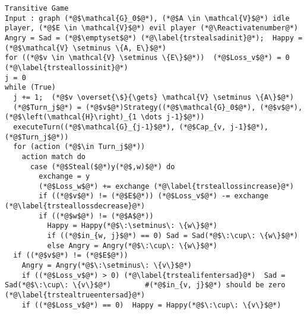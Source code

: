      \Suppressnumber
     \begin{lstlisting}[label=transitivegame, style=numbers]
Transitive Game
Input : graph (*@$\mathcal{G}_0$@*), (*@$A \in \mathcal{V}$@*) idle player, (*@$E \in \mathcal{V}$@*) evil player (*@\Reactivatenumber@*)
Angry = Sad = (*@$\emptyset$@*) (*@\label{trstealsadinit}@*);  Happy = (*@$\mathcal{V} \setminus \{A, E\}$@*)
for ((*@$v \in \mathcal{V} \setminus \{E\}$@*))  (*@$Loss_v$@*) = 0 (*@\label{trsteallossinit}@*)
j = 0
while (True)
  j += 1;  (*@$v \overset{\$}{\gets} \mathcal{V} \setminus \{A\}$@*)
  (*@$Turn_j$@*) = (*@$v$@*)Strategy((*@$\mathcal{G}_0$@*), (*@$v$@*), (*@$\left(\mathcal{H}\right)_{1 \dots j-1}$@*))
  executeTurn((*@$\mathcal{G}_{j-1}$@*), (*@$Cap_{v, j-1}$@*), (*@$Turn_j$@*))
  for (action (*@$\in Turn_j$@*))
    action match do
      case (*@$Steal($@*)y(*@$,w)$@*) do
        exchange = y
        (*@$Loss_w$@*) += exchange (*@\label{trsteallossincrease}@*)
        if ((*@$v$@*) != (*@$E$@*)) (*@$Loss_v$@*) -= exchange (*@\label{trsteallossdecrease}@*)
        if ((*@$w$@*) != (*@$A$@*))
          Happy = Happy(*@$\:\setminus\: \{w\}$@*)
          if ((*@$in_{w, j}$@*) == 0) Sad = Sad(*@$\:\cup\: \{w\}$@*)
          else Angry = Angry(*@$\:\cup\: \{w\}$@*)
  if ((*@$v$@*) != (*@$E$@*))
    Angry = Angry(*@$\:\setminus\: \{v\}$@*)
    if ((*@$Loss_v$@*) > 0) (*@\label{trstealifentersad}@*)  Sad = Sad(*@$\:\cup\: \{v\}$@*)        #(*@$in_{v, j}$@*) should be zero (*@\label{trstealtrueentersad}@*)
    if ((*@$Loss_v$@*) == 0)  Happy = Happy(*@$\:\cup\: \{v\}$@*)
     \end{lstlisting}
